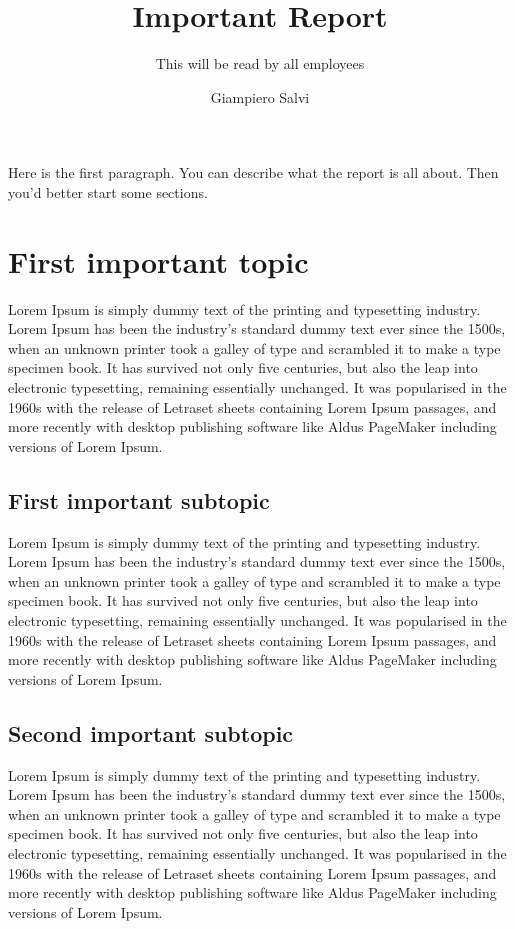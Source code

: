 \documentclass{kthreport}
\title{Important Report}
\subtitle{This will be read by all employees}
\author{Giampiero Salvi}
\begin{document}
\maketitle

Here is the first paragraph. You can describe what the report is all about.
Then you'd better start some sections.

\section{First important topic}
Lorem Ipsum is simply dummy text of the printing and typesetting industry. Lorem Ipsum has been the industry's standard dummy text ever since the 1500s, when an unknown printer took a galley of type and scrambled it to make a type specimen book. It has survived not only five centuries, but also the leap into electronic typesetting, remaining essentially unchanged. It was popularised in the 1960s with the release of Letraset sheets containing Lorem Ipsum passages, and more recently with desktop publishing software like Aldus PageMaker including versions of Lorem Ipsum.
\subsection{First important subtopic}
Lorem Ipsum is simply dummy text of the printing and typesetting industry. Lorem Ipsum has been the industry's standard dummy text ever since the 1500s, when an unknown printer took a galley of type and scrambled it to make a type specimen book. It has survived not only five centuries, but also the leap into electronic typesetting, remaining essentially unchanged. It was popularised in the 1960s with the release of Letraset sheets containing Lorem Ipsum passages, and more recently with desktop publishing software like Aldus PageMaker including versions of Lorem Ipsum.
\subsection{Second important subtopic}
Lorem Ipsum is simply dummy text of the printing and typesetting industry. Lorem Ipsum has been the industry's standard dummy text ever since the 1500s, when an unknown printer took a galley of type and scrambled it to make a type specimen book. It has survived not only five centuries, but also the leap into electronic typesetting, remaining essentially unchanged. It was popularised in the 1960s with the release of Letraset sheets containing Lorem Ipsum passages, and more recently with desktop publishing software like Aldus PageMaker including versions of Lorem Ipsum.
\end{document}
